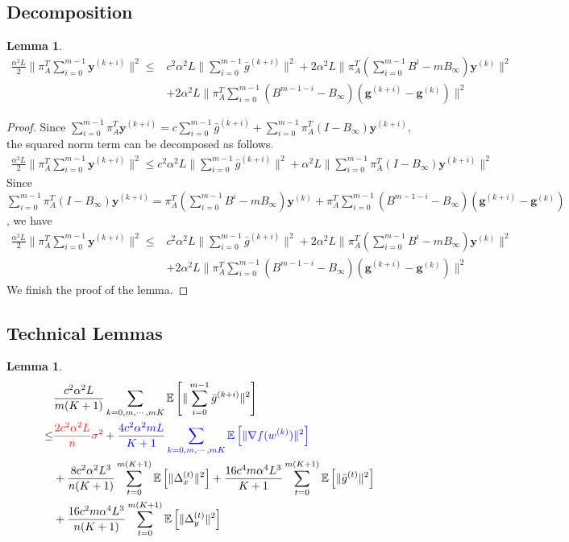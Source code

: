 \documentclass{article}
\newtheorem{lemma}[thm]{Lemma}
\newcommand{\vg}{{\mathbf{g}}}
\newcommand{\vy}{{\mathbf{y}}}
\newcommand{\EE}[1]{\mathbb{E}\left[#1\right]}
\newcommand{\norm}[1]{\| #1 \|}
\begin{document}
\subsection{Decomposition}
\begin{lemma}\label{Convergence Analysis: Quadratic Term-Decomposition}
  \begin{align*}
    \frac{\alpha^2L}{2}\norm{\pi_{A}^T\sum_{i=0}^{m-1}\vy^{(k+i)}}^2\leq &c^2\alpha^2L\norm{\sum_{i=0}^{m-1}\bar{g}^{(k+i)}}^2+2\alpha^2L\norm{\pi_A^T(\sum_{i=0}^{m-1}B^i - m B_{\infty})\vy^{(k)}}^2\\&+2\alpha^2L\norm{\pi_A^{T}\sum_{i=0}^{m-1}(B^{m-1-i}-B_{\infty})(\vg^{(k+i)}-\vg^{(k)})}^2
  \end{align*}
\end{lemma}
\begin{proof}
  Since $\sum_{i=0}^{m-1}\pi_{A}^T\vy^{(k+i)}=c\sum_{i=0}^{m-1}\bar{g}^{(k+i)}+\sum_{i=0}^{m-1}\pi_A^{T}(I-B_{\infty})\vy^{(k+i)}$, the squared norm term can be decomposed as follows.
\begin{align*}
  \frac{\alpha^2L}{2}\norm{\pi_{A}^T\sum_{i=0}^{m-1}\vy^{(k+i)}}^2 \leq c^2\alpha^2L\norm{\sum_{i=0}^{m-1}\bar{g}^{(k+i)}}^2+\alpha^2L\norm{\sum_{i=0}^{m-1}\pi_A^{T}(I-B_{\infty})\vy^{(k+i)}}^2
\end{align*}
Since $\sum_{i=0}^{m-1}\pi_A^{T}(I-B_{\infty})\vy^{(k+i)}=\pi_A^T(\sum_{i=0}^{m-1}B^i - m B_{\infty})\vy^{(k)}+\pi_A^{T}\sum_{i=0}^{m-1}(B^{m-1-i}-B_{\infty})(\vg^{(k+i)}-\vg^{(k)})$, we have
\begin{align*}
  \frac{\alpha^2L}{2}\norm{\pi_{A}^T\sum_{i=0}^{m-1}\vy^{(k+i)}}^2\leq &c^2\alpha^2L\norm{\sum_{i=0}^{m-1}\bar{g}^{(k+i)}}^2+2\alpha^2L\norm{\pi_A^T(\sum_{i=0}^{m-1}B^i - m B_{\infty})\vy^{(k)}}^2\\&+2\alpha^2L\norm{\pi_A^{T}\sum_{i=0}^{m-1}(B^{m-1-i}-B_{\infty})(\vg^{(k+i)}-\vg^{(k)})}^2
\end{align*}
We finish the proof of the lemma.
\end{proof}

\subsection{Technical Lemmas}
\begin{lemma}\label{Convergence Analysis: Quadratic Term-Decomposition-1}
  \begin{align*}
    &\frac{c^2\alpha^2L}{m(K+1)}\sum_{k=0,m,\cdots,mK}\EE{\norm{\sum_{i=0}^{m-1}\bar{g}^{(k+i)}}^2}
  \\ \leq& \textcolor{red}{ \frac{2c^2\alpha^2L}{n}\sigma^2}+ \textcolor{blue}{\frac{4c^2\alpha^2mL}{K+1}\sum_{k=0,m,\cdots,mK}\EE{\norm{\nabla f(w^{(k)})}^2}}\\&+\frac{8c^2\alpha^2L^3}{n(K+1)}\sum_{t=0}^{m(K+1)}\EE{\norm{\Delta_x^{(t)}}^2}+\frac{16c^4m\alpha^4L^3}{K+1}\sum_{t=0}^{m(K+1)}\EE{\norm{\bar{g}^{(t)}}^2}\\&+\frac{16c^2m\alpha^4L^3}{n(K+1)}\sum_{t=0}^{m(K+1)}\EE{\norm{\Delta_y^{(t)}}^2}
  \end{align*}
\end{lemma}
\end{document}
